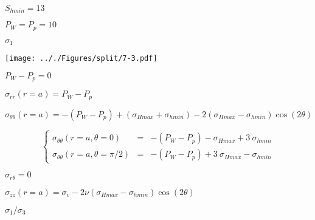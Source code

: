 \documentclass[onecolumn,11pt]{report}
\def\lthtmlcheckvsize{\ifdim\ht\sizebox<\vsize 
  \ifdim\wd\sizebox<\hsize\expandafter\hfill\fi \expandafter\vfill
  \else\expandafter\vss\fi}%
\begin{document}
{\newpage\clearpage
{}%
$ S_{hmin}=13$%
\lthtmlindisplaymathZ
\lthtmlcheckvsize\clearpage}

{\newpage\clearpage
{}%
$ P_W=P_p=10$%
\lthtmlindisplaymathZ
\lthtmlcheckvsize\clearpage}

{\newpage\clearpage
{}%
$ \sigma_{1}$%
\lthtmlindisplaymathZ
\lthtmlcheckvsize\clearpage}

{\newpage\clearpage
{}%
\texttt{[image: .././Figures/split/7-3.pdf]}%
\lthtmlpictureZ
\lthtmlcheckvsize\clearpage}

{\newpage\clearpage
{}%
$ P_W-P_p = 0$%
\lthtmlindisplaymathZ
\lthtmlcheckvsize\clearpage}

{\newpage\clearpage
{}%
$\displaystyle \sigma_{rr}(r=a) = P_W - P_p$%
\lthtmlindisplaymathZ
\lthtmlcheckvsize\clearpage}

{\newpage\clearpage
{}%
$\displaystyle \sigma_{\theta \theta} (r=a) =
-(P_W - P_p) +(\sigma_{Hmax}+\sigma_{hmin})
-2(\sigma_{Hmax}-\sigma_{hmin}) \cos (2\theta)$%
\lthtmlindisplaymathZ
\lthtmlcheckvsize\clearpage}

{\newpage\clearpage
{}%
\begin{displaymath}\left\lbrace
\begin{array}{rcl}
\sigma_{\theta \theta} (r=a,\theta=0) & = &
-(P_W - P_p) -\sigma_{Hmax} + 3 \: \sigma_{hmin} \\
\sigma_{\theta \theta} (r=a,\theta=\pi/2) & = &
-(P_W - P_p) +3 \: \sigma_{Hmax} -\sigma_{hmin}
\end{array}
\right.\end{displaymath}%
\lthtmldisplayZ
\lthtmlcheckvsize\clearpage}

{\newpage\clearpage
{}%
$ \sigma_{r \theta} = 0$%
\lthtmlindisplaymathZ
\lthtmlcheckvsize\clearpage}

{\newpage\clearpage
{}%
$\displaystyle \sigma_{zz} (r=a) =  \sigma_v - 2\nu (\sigma_{Hmax}-\sigma_{hmin}) \cos (2\theta)$%
\lthtmlindisplaymathZ
\lthtmlcheckvsize\clearpage}

{\newpage\clearpage
{}%
$ \sigma_1/\sigma_3$%
\lthtmlindisplaymathZ
\lthtmlcheckvsize\clearpage}
\end{document}

